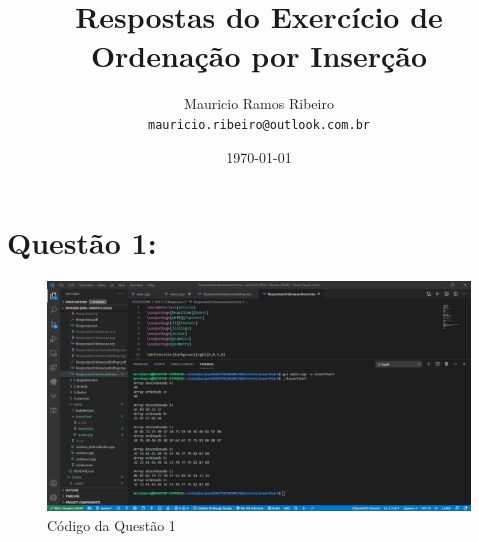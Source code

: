 \documentclass{article}
\author{
  Mauricio Ramos Ribeiro\\
  \texttt{mauricio.ribeiro@outlook.com.br}
}
\title{Respostas do Exercício de Ordenação por Inserção}
\date{\today}
\begin{document}
\maketitle

\vspace{15mm}


\section*{Questão 1:}

\begin{figure}[h!]
  \includegraphics[scale=0.42]{insertSort.png}
  \caption{Código da Questão 1}
\end{figure}
\vspace{15mm}
\end{document}
